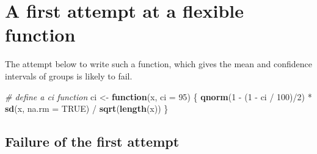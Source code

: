 \documentclass[]{book}
\newenvironment{Shaded}{}{}
\newcommand{\CommentTok}[1]{\textcolor[rgb]{0.38,0.63,0.69}{\textit{#1}}}
\newcommand{\ControlFlowTok}[1]{\textcolor[rgb]{0.00,0.44,0.13}{\textbf{#1}}}
\newcommand{\DataTypeTok}[1]{\textcolor[rgb]{0.56,0.13,0.00}{#1}}
\newcommand{\DecValTok}[1]{\textcolor[rgb]{0.25,0.63,0.44}{#1}}
\newcommand{\KeywordTok}[1]{\textcolor[rgb]{0.00,0.44,0.13}{\textbf{#1}}}
\newcommand{\NormalTok}[1]{#1}
\newcommand{\OperatorTok}[1]{\textcolor[rgb]{0.40,0.40,0.40}{#1}}
\newcommand{\OtherTok}[1]{\textcolor[rgb]{0.00,0.44,0.13}{#1}}
\newcommand{\StringTok}[1]{\textcolor[rgb]{0.25,0.44,0.63}{#1}}
\begin{document}
\hypertarget{a-first-attempt-at-a-flexible-function}{%
\section{A first attempt at a flexible function}\label{a-first-attempt-at-a-flexible-function}}

The attempt below to write such a function, which gives the mean and confidence intervals of groups is likely to fail.

\begin{Shaded}
\begin{Highlighting}[]
\CommentTok{# define a ci function}
\NormalTok{ci <-}\StringTok{ }\ControlFlowTok{function}\NormalTok{(x, }\DataTypeTok{ci =} \DecValTok{95}\NormalTok{) \{}
  \KeywordTok{qnorm}\NormalTok{(}\DecValTok{1} \OperatorTok{-}\StringTok{ }\NormalTok{(}\DecValTok{1} \OperatorTok{-}\StringTok{ }\NormalTok{ci }\OperatorTok{/}\StringTok{ }\DecValTok{100}\NormalTok{)}\OperatorTok{/}\DecValTok{2}\NormalTok{) }\OperatorTok{*}\StringTok{ }\KeywordTok{sd}\NormalTok{(x, }\DataTypeTok{na.rm =} \OtherTok{TRUE}\NormalTok{) }\OperatorTok{/}\StringTok{ }\KeywordTok{sqrt}\NormalTok{(}\KeywordTok{length}\NormalTok{(x))}
\NormalTok{\}}
\end{Highlighting}
\end{Shaded}

\begin{Shaded}
\end{Shaded}

\hypertarget{failure-of-the-first-attempt}{%
\subsection{Failure of the first attempt}\label{failure-of-the-first-attempt}}
\end{document}

